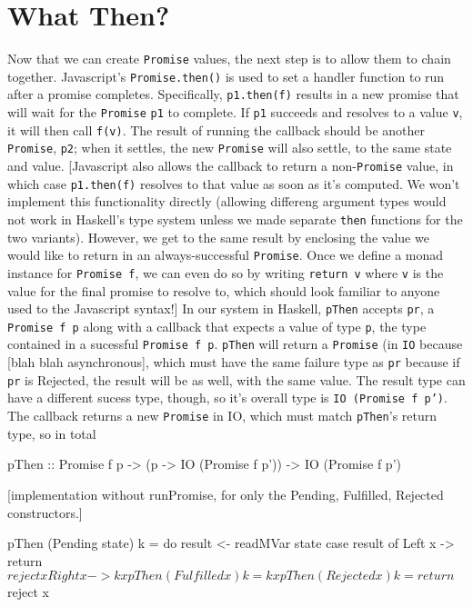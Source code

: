 \documentclass[12pt, english, letterpaper]{kuthesis}
\newcommand{\lit}[1]{\texttt{#1}}
\begin{document}
\section*{What Then?}
Now that we can create \lit{Promise} values, the next step is to allow them to chain together.  Javascript's \lit{Promise.then()} is used to set a handler function to run after a promise completes.  Specifically, \lit{p1.then(f)} results in a new promise that will wait for the \lit{Promise} \lit{p1} to complete.  If \lit{p1} succeeds and resolves to a value \lit v, it will then call \lit{f(v)}.  The result of running the callback should be another \lit{Promise}, \lit{p2}; when it settles, the new \lit{Promise} will also settle, to the same state and value.
[Javascript also allows the callback to return a non-\lit{Promise} value, in which case \lit{p1.then(f)} resolves to that value as soon as it's computed.  We won't implement this functionality directly
(allowing differeng argument types would not work in Haskell's type system unless we made separate \lit{then} functions for the two variants).  However, we get to the same result by enclosing the value we would like to return in an always-successful \lit{Promise}.  Once we define a monad instance for \lit{Promise f}, we can even do so by writing \lit{return v} where \lit{v} is the value for the final promise to resolve to, which should look familiar to anyone used to the Javascript syntax!]
In our system in Haskell, \lit{pThen} accepts \lit{pr}, a \lit{Promise f p} along with a callback that expects a value of type \lit p, the type contained in a sucessful \lit{Promise f p}.  \lit{pThen} will return a \lit{Promise} (in \lit{IO} because [blah blah asynchronous], which must have the same failure type as \lit{pr} because if \lit{pr} is Rejected, the result will be as well, with the same value.  The result type can have a different sucess type, though, so it's overall type is \lit{IO (Promise f p')}.  The callback returns a new \lit{Promise} in IO, which must match \lit{pThen}'s return type, so in total
\begin{code}
pThen :: Promise f p
        -> (p -> IO (Promise f p'))
        -> IO (Promise f p')
\end{code}
[implementation without runPromise, for only the Pending, Fulfilled, Rejected constructors.]
\begin{code}
pThen (Pending state) k = do
  result <- readMVar state
  case result of
    Left x -> return $ reject x
    Right x -> k x
pThen (Fulfilled x) k = k x
pThen (Rejected x) k = return $ reject x
\end{code}
      
\end{document}

